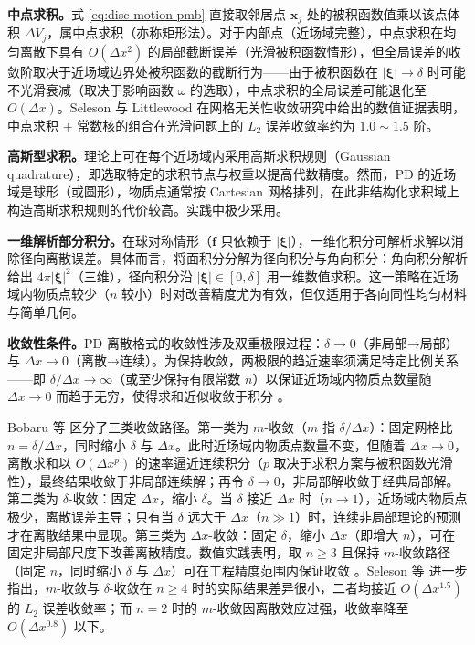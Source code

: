 \textbf{中点求积。}式 \eqref{eq:disc-motion-pmb} 直接取邻居点 $\mathbf{x}_j$ 处的被积函数值乘以该点体积 $\Delta V_j$，属中点求积（亦称矩形法）。对于内部点（近场域完整），中点求积在均匀离散下具有 $O(\Delta x^2)$ 的局部截断误差（光滑被积函数情形），但全局误差的收敛阶取决于近场域边界处被积函数的截断行为——由于被积函数在 $|\boldsymbol{\xi}|\to\delta$ 时可能不光滑衰减（取决于影响函数 $\omega$ 的选取），中点求积的全局误差可能退化至 $O(\Delta x)$。Seleson 与 Littlewood \cite{SelesonLittlewood2016} 在网格无关性收敛研究中给出的数值证据表明，中点求积 + 常数核的组合在光滑问题上的 $L_2$ 误差收敛率约为 $1.0\sim1.5$ 阶。

\textbf{高斯型求积。}理论上可在每个近场域内采用高斯求积规则（Gaussian quadrature），即选取特定的求积节点与权重以提高代数精度。然而，PD 的近场域是球形（或圆形），物质点通常按 Cartesian 网格排列，在此非结构化求积域上构造高斯求积规则的代价较高。实践中极少采用。

\textbf{一维解析部分积分。}在球对称情形（$\mathbf{f}$ 只依赖于 $|\boldsymbol{\xi}|$），一维化积分可解析求解以消除径向离散误差。具体而言，将面积分分解为径向积分与角向积分：角向积分解析给出 $4\pi|\boldsymbol{\xi}|^2$（三维），径向积分沿 $|\boldsymbol{\xi}|\in[0,\delta]$ 用一维数值求积。这一策略在近场域内物质点较少（$n$ 较小）时对改善精度尤为有效，但仅适用于各向同性均匀材料与简单几何。

\textbf{收敛性条件。}PD 离散格式的收敛性涉及双重极限过程：$\delta\to0$（非局部→局部）与 $\Delta x\to0$（离散→连续）。为保持收敛，两极限的趋近速率须满足特定比例关系——即 $\delta/\Delta x\to\infty$（或至少保持有限常数 $n$）以保证近场域内物质点数量随 $\Delta x\to0$ 而趋于无穷，使得求和近似收敛于积分 \cite{Bobaru2009,SelesonLittlewood2016}。

Bobaru 等 \cite{Bobaru2009} 区分了三类收敛路径。第一类为 $m$-收敛（$m$ 指 $\delta/\Delta x$）：固定网格比 $n=\delta/\Delta x$，同时缩小 $\delta$ 与 $\Delta x$。此时近场域内物质点数量不变，但随着 $\Delta x\to0$，离散求和以 $O(\Delta x^p)$ 的速率逼近连续积分（$p$ 取决于求积方案与被积函数光滑性），最终结果收敛于非局部连续解；再令 $\delta\to0$，非局部解收敛于经典局部解。第二类为 $\delta$-收敛：固定 $\Delta x$，缩小 $\delta$。当 $\delta$ 接近 $\Delta x$ 时（$n\to1$），近场域内物质点极少，离散误差主导；只有当 $\delta$ 远大于 $\Delta x$（$n\gg1$）时，连续非局部理论的预测才在离散结果中显现。第三类为 $\Delta x$-收敛：固定 $\delta$，缩小 $\Delta x$（即增大 $n$），可在固定非局部尺度下改善离散精度。数值实践表明，取 $n\ge3$ 且保持 $m$-收敛路径（固定 $n$，同时缩小 $\delta$ 与 $\Delta x$）可在工程精度范围内保证收敛 \cite{Bobaru2009}。Seleson 等 \cite{SelesonLittlewood2016} 进一步指出，$m$-收敛与 $\delta$-收敛在 $n\ge4$ 时的实际结果差异很小，二者均接近 $O(\Delta x^{1.5})$ 的 $L_2$ 误差收敛率；而 $n=2$ 时的 $m$-收敛因离散效应过强，收敛率降至 $O(\Delta x^{0.8})$ 以下。

